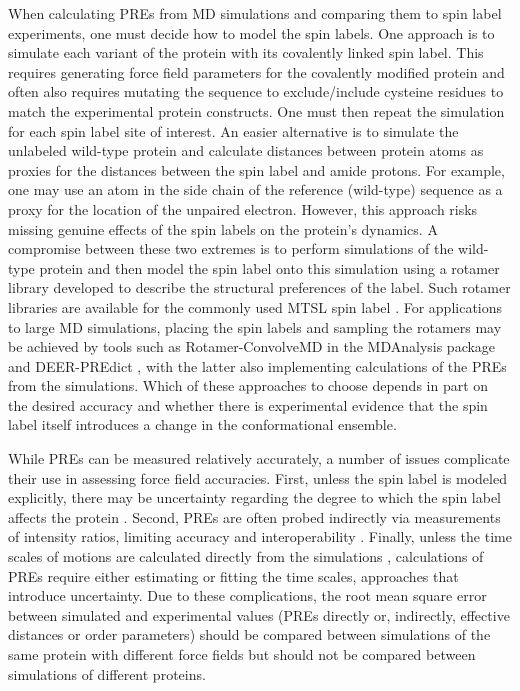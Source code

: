 \documentclass[9pt,review,pubversion]{livecoms}
\begin{document}
When calculating PREs from MD simulations and comparing them to spin label experiments, one must decide how to model the spin labels.
One approach is to simulate each variant of the protein with its covalently linked spin label.
This requires generating force field parameters for the covalently modified protein and often also requires mutating the sequence to exclude/include cysteine residues to match the experimental protein constructs.
One must then repeat the simulation for each spin label site of interest.
An easier alternative is to simulate the unlabeled wild-type protein and calculate distances between protein atoms as proxies for the distances between the spin label and amide protons.
For example, one may use an atom in the side chain of the reference (wild-type) sequence as a proxy for the location of the unpaired electron.
However, this approach risks missing genuine effects of the spin labels on the protein’s dynamics.
A compromise between these two extremes is to perform simulations of the wild-type protein and then model the spin label onto this simulation using a rotamer library developed to describe the structural preferences of the label.
Such rotamer libraries are available for the commonly used MTSL spin label \cite{polyhach_rotamer_2011}.
For applications to large MD simulations, placing the spin labels and sampling the rotamers may be achieved by tools such as Rotamer-ConvolveMD in the MDAnalysis package \cite{michaud-agrawal_mdanalysis_2011,gowers_mdanalysis_2016} and DEER-PREdict \cite{tesei_deer-predict_2021}, with the latter also implementing calculations of the PREs from the simulations.
Which of these approaches to choose depends in part on the desired accuracy and whether there is experimental evidence that the spin label itself introduces a change in the conformational ensemble.

While PREs can be measured relatively accurately, a number of issues complicate their use in assessing force field accuracies.
First, unless the spin label is modeled explicitly, there may be uncertainty regarding the degree to which the spin label affects the protein \cite{sasmal2017effect,tesei_deer-predict_2021}.
Second, PREs are often probed indirectly via measurements of intensity ratios, limiting accuracy and interoperability \cite{clore2009theory}.
Finally, unless the time scales of motions are calculated directly from the simulations \cite{xue2011motion}, calculations of PREs require either estimating \cite{tesei_deer-predict_2021} or fitting \cite{tesei2021accurate} the time scales, approaches that introduce uncertainty.
Due to these complications, the root mean square error between simulated and experimental values (PREs directly or, indirectly, effective distances or order parameters) should be compared between simulations of the same protein with different force fields but should not be compared between simulations of different proteins.
\end{document}
